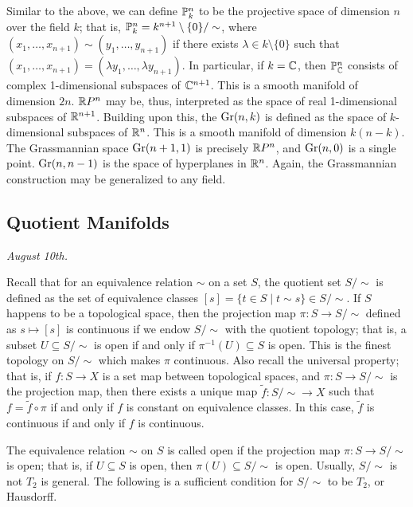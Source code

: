 \begin{example}
    Similar to the above, we can define $\mathbb{P}_{k}^{n}$ to be the projective space of dimension $n$ over the field $k$; that is, $\mathbb{P}_{k}^{n} = k^{n+1}\setminus\{0\}/\sim$, where $(x_{1},\ldots,x_{n+1}) \sim (y_{1},\ldots,y_{n+1})$ if there exists $\lambda \in k\setminus\{0\}$ such that $(x_{1},\ldots,x_{n+1}) = (\lambda y_{1},\ldots,\lambda y_{n+1})$. In particular, if $k = \mathbb{C}$, then $\mathbb{P}_{\mathbb{C}}^{n}$ consists of complex 1-dimensional subspaces of $\mathbb{C}^{n+1}$. This is a smooth manifold of dimension $2n$. $\mathbb{R} P^{n}$ may be, thus, interpreted as the space of real 1-dimensional subspaces of $\mathbb{R}^{n+1}$. Building upon this, the  $\operatorname{Gr}(n,k)$ is defined as the space of $k$-dimensional subspaces of $\mathbb{R}^{n}$. This is a smooth manifold of dimension $k(n-k)$. The Grassmannian space $\operatorname{Gr}(n+1,1)$ is precisely $\mathbb{R} P^{n}$, and $\operatorname{Gr}(n,0)$ is a single point. $\operatorname{Gr}(n,n-1)$ is the space of hyperplanes in $\mathbb{R}^{n}$. Again, the Grassmannian construction may be generalized to any field.
\end{example}

\subsection{Quotient Manifolds}
\textit{August 10th.}

Recall that for an equivalence relation $\sim$ on a set $S$, the quotient set $S/\!\sim$ is defined as the set of equivalence classes $[s] = \{t \in S \mid t \sim s\} \in S/\!\sim$. If $S$ happens to be a topological space, then the projection map $\pi:S \to S/\!\sim$ defined as $s \mapsto [s]$ is continuous if we endow $S/\!\sim$ with the quotient topology; that is, a subset $U \subseteq S/\!\sim$ is open if and only if $\pi^{-1}(U) \subseteq S$ is open. This is the finest topology on $S/\!\sim$ which makes $\pi$ continuous. Also recall the universal property; that is, if $f:S \to X$ is a set map between topological spaces, and $\pi:S \to S/\!\sim$ is the projection map, then there exists a unique map $\tilde{f}:S/\!\sim \to X$ such that $f = \tilde{f} \circ \pi$ if and only if $f$ is constant on equivalence classes. In this case, $\tilde{f}$ is continuous if and only if $f$ is continuous.

The equivalence relation $\sim$ on $S$ is called open if the projection map $\pi:S \to S/\!\sim$ is open; that is, if $U \subseteq S$ is open, then $\pi(U) \subseteq S/\!\sim$ is open. Usually, $S/\!\sim$ is not $T_{2}$ is general. The following is a sufficient condition for $S/\!\sim$ to be $T_{2}$, or Hausdorff.

